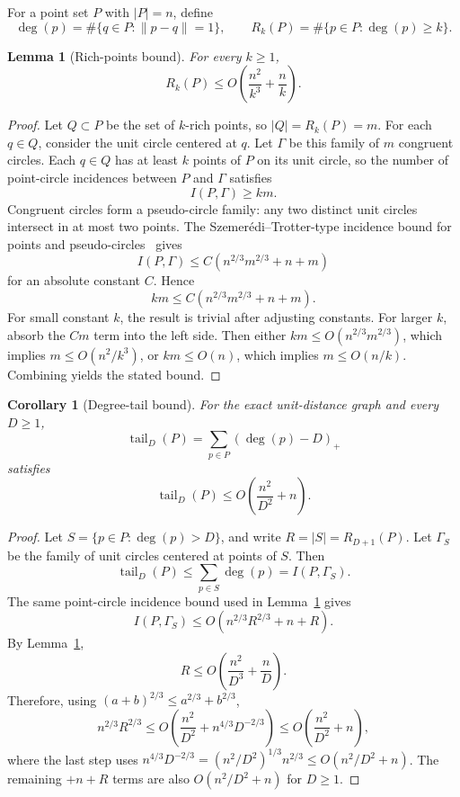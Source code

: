 \documentclass[11pt]{article}
\newtheorem{lemma}[theorem]{Lemma}
\newtheorem{corollary}[theorem]{Corollary}
\newcommand{\tail}{\operatorname{tail}}
\begin{document}
For a point set \(P\) with \(|P|=n\), define
\[
\deg(p)=\#\{q\in P:\|p-q\|=1\},\qquad
R_k(P)=\#\{p\in P:\deg(p)\ge k\}.
\]

\begin{lemma}[Rich-points bound]
\label{lem:rich}
For every \(k\ge 1\),
\[
R_k(P)\le O\!\left(\frac{n^2}{k^3}+\frac{n}{k}\right).
\]
\end{lemma}

\begin{proof}
Let \(Q\subset P\) be the set of \(k\)-rich points, so \(|Q|=R_k(P)=m\). For each \(q\in Q\), consider the unit circle centered at \(q\). Let \(\Gamma\) be this family of \(m\) congruent circles. Each \(q\in Q\) has at least \(k\) points of \(P\) on its unit circle, so the number of point-circle incidences between \(P\) and \(\Gamma\) satisfies
\[
I(P,\Gamma)\ge km.
\]
Congruent circles form a pseudo-circle family: any two distinct unit circles intersect in at most two points. The Szemerédi--Trotter-type incidence bound for points and pseudo-circles~\cite{PachSharir98} gives
\[
I(P,\Gamma)\le C(n^{2/3}m^{2/3}+n+m)
\]
for an absolute constant \(C\). Hence
\[
km\le C(n^{2/3}m^{2/3}+n+m).
\]
For small constant \(k\), the result is trivial after adjusting constants. For larger \(k\), absorb the \(Cm\) term into the left side. Then either \(km\le O(n^{2/3}m^{2/3})\), which implies \(m\le O(n^2/k^3)\), or \(km\le O(n)\), which implies \(m\le O(n/k)\). Combining yields the stated bound.
\end{proof}

\begin{corollary}[Degree-tail bound]
\label{cor:tail}
For the exact unit-distance graph and every \(D\ge 1\),
\[
\tail_D(P)=\sum_{p\in P}(\deg(p)-D)_+
\]
satisfies
\[
\tail_D(P)\le O\!\left(\frac{n^2}{D^2}+n\right).
\]
\end{corollary}

\begin{proof}
Let \(S=\{p\in P:\deg(p)>D\}\), and write \(R=|S|=R_{D+1}(P)\). Let \(\Gamma_S\) be the family of unit circles centered at points of \(S\). Then
\[
\tail_D(P)\le \sum_{p\in S}\deg(p)=I(P,\Gamma_S).
\]
The same point-circle incidence bound used in Lemma~\ref{lem:rich} gives
\[
I(P,\Gamma_S)\le O(n^{2/3}R^{2/3}+n+R).
\]
By Lemma~\ref{lem:rich},
\[
R\le O\!\left(\frac{n^2}{D^3}+\frac{n}{D}\right).
\]
Therefore, using \((a+b)^{2/3}\le a^{2/3}+b^{2/3}\),
\[
n^{2/3}R^{2/3}
\le O\!\left(\frac{n^2}{D^2}+n^{4/3}D^{-2/3}\right)
\le O\!\left(\frac{n^2}{D^2}+n\right),
\]
where the last step uses \(n^{4/3}D^{-2/3}=(n^2/D^2)^{1/3}n^{2/3}\le O(n^2/D^2+n)\). The remaining \(+n+R\) terms are also \(O(n^2/D^2+n)\) for \(D\ge1\).
\end{proof}
\end{document}
